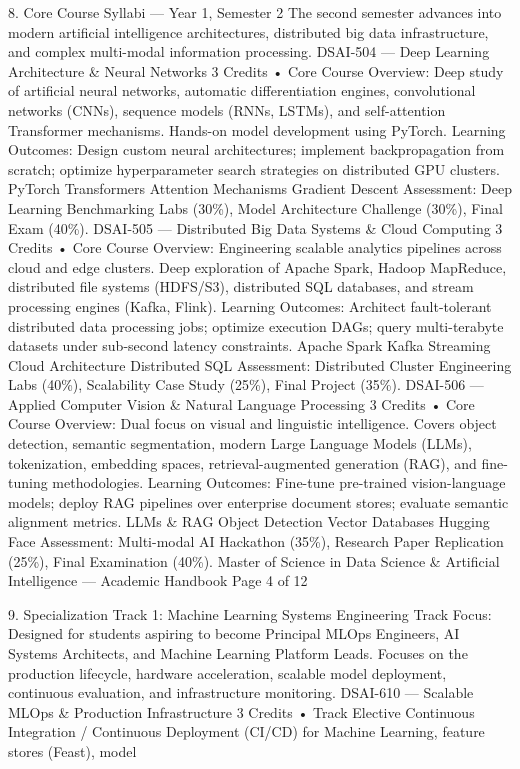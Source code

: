\documentclass[12pt]{article}
\begin{document}
8. Core Course Syllabi — Year 1, Semester 2
The second semester advances into modern artificial intelligence architectures, distributed big data infrastructure,
and complex multi-modal information processing.
DSAI-504 — Deep Learning Architecture \& Neural Networks
3 Credits • Core
Course Overview: Deep study of artificial neural networks, automatic differentiation engines, convolutional
networks (CNNs), sequence models (RNNs, LSTMs), and self-attention Transformer mechanisms. Hands-on
model development using PyTorch.
Learning Outcomes: Design custom neural architectures; implement backpropagation from scratch; optimize
hyperparameter search strategies on distributed GPU clusters.
PyTorch Transformers Attention Mechanisms Gradient Descent
Assessment: Deep Learning Benchmarking Labs (30\%), Model Architecture Challenge (30\%), Final Exam (40\%).
DSAI-505 — Distributed Big Data Systems \& Cloud Computing
3 Credits • Core
Course Overview: Engineering scalable analytics pipelines across cloud and edge clusters. Deep exploration of
Apache Spark, Hadoop MapReduce, distributed file systems (HDFS/S3), distributed SQL databases, and stream
processing engines (Kafka, Flink).
Learning Outcomes: Architect fault-tolerant distributed data processing jobs; optimize execution DAGs; query
multi-terabyte datasets under sub-second latency constraints.
Apache Spark Kafka Streaming Cloud Architecture Distributed SQL
Assessment: Distributed Cluster Engineering Labs (40\%), Scalability Case Study (25\%), Final Project (35\%).
DSAI-506 — Applied Computer Vision \& Natural Language Processing
3 Credits • Core
Course Overview: Dual focus on visual and linguistic intelligence. Covers object detection, semantic
segmentation, modern Large Language Models (LLMs), tokenization, embedding spaces, retrieval-augmented
generation (RAG), and fine-tuning methodologies.
Learning Outcomes: Fine-tune pre-trained vision-language models; deploy RAG pipelines over enterprise
document stores; evaluate semantic alignment metrics.
LLMs \& RAG Object Detection Vector Databases Hugging Face
Assessment: Multi-modal AI Hackathon (35\%), Research Paper Replication (25\%), Final Examination (40\%).
Master of Science in Data Science \& Artificial Intelligence — Academic Handbook
Page 4 of 12

9. Specialization Track 1: Machine Learning Systems Engineering
Track Focus: Designed for students aspiring to become Principal MLOps Engineers, AI Systems Architects, and
Machine Learning Platform Leads. Focuses on the production lifecycle, hardware acceleration, scalable model
deployment, continuous evaluation, and infrastructure monitoring.
DSAI-610 — Scalable MLOps \& Production Infrastructure
3 Credits • Track Elective
Continuous Integration / Continuous Deployment (CI/CD) for Machine Learning, feature stores (Feast), model
\end{document}
